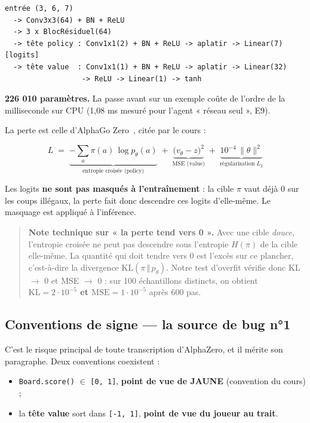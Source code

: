 \documentclass[11pt,a4paper]{article}
\begin{document}
\begin{lstlisting}[caption={La tour résiduelle et ses deux têtes.},label={lst:net},numbers=none]
entrée (3, 6, 7)
  -> Conv3x3(64) + BN + ReLU
  -> 3 x BlocRésiduel(64)
  -> tête policy : Conv1x1(2) + BN + ReLU -> aplatir -> Linear(7)   [logits]
  -> tête value  : Conv1x1(1) + BN + ReLU -> aplatir -> Linear(32)
                  -> ReLU -> Linear(1) -> tanh
\end{lstlisting}

\textbf{226 010 paramètres.} La passe avant sur un exemple coûte de l'ordre de la
milliseconde sur CPU (1,08 ms mesuré pour l'agent « réseau seul », E9).

La perte est celle d'AlphaGo Zero~\cite{silver2017}, citée par le cours :

\begin{equation*}
L \;=\; \underbrace{-\sum_a \pi(a)\,\log p_\theta(a)}_{\text{entropie croisée (policy)}}
\;+\; \underbrace{\bigl(v_\theta - z\bigr)^2}_{\text{MSE (value)}}
\;+\; \underbrace{10^{-4}\,\lVert\theta\rVert^2}_{\text{régularisation } L_2}
\end{equation*}

Les logits \textbf{ne sont pas masqués à l'entraînement} : la cible $\pi$ vaut déjà 0
sur les coups illégaux, la perte fait donc descendre ces logits d'elle-même. Le
masquage est appliqué à l'inférence.

\begin{quote}
\textbf{Note technique sur « la perte tend vers 0 ».} Avec une cible \emph{douce},
l'entropie croisée ne peut pas descendre sous l'entropie $H(\pi)$ de la cible
elle-même. La quantité qui doit tendre vers 0 est l'excès sur ce plancher,
c'est-à-dire la divergence $\mathrm{KL}(\pi \,\Vert\, p_\theta)$. Notre test
d'overfit vérifie donc KL $\rightarrow$ 0 et MSE $\rightarrow$ 0 : sur 100 échantillons distincts, on
obtient \textbf{$\mathrm{KL} = 2\cdot 10^{-5}$ et $\mathrm{MSE} = 1\cdot 10^{-5}$} après 600 pas.
\end{quote}

\subsection{Conventions de signe --- la source de bug n°1}\label{conventions-de-signe-la-source-de-bug-n1}

C'est le risque principal de toute transcription d'AlphaZero, et il mérite son
paragraphe.
Deux conventions coexistent :

\begin{itemize}
\setlength{\itemsep}{1pt}\setlength{\parskip}{0pt}
\item
  \texttt{Board.score()} $\in$ \texttt{{[}0,\ 1{]}}, \textbf{point de vue de JAUNE} (convention du cours) ;
\item
  la \textbf{tête value} sort dans \texttt{{[}-1,\ 1{]}}, \textbf{point de vue du joueur au trait}.
\end{itemize}
\end{document}
